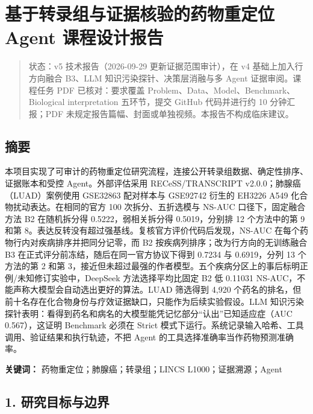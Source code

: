 \documentclass[
  10pt,
]{ctexart}
\author{}
\date{}
\begin{document}
\section{基于转录组与证据核验的药物重定位 Agent
课程设计报告}\label{ux57faux4e8eux8f6cux5f55ux7ec4ux4e0eux8bc1ux636eux6838ux9a8cux7684ux836fux7269ux91cdux5b9aux4f4d-agent-ux8bfeux7a0bux8bbeux8ba1ux62a5ux544a}

\begin{quote}
状态：v5 技术报告（2026-09-29 更新证据范围审计），在 v4
基础上加入行方向融合 B3、LLM 知识污染探针、决策层消融与多 Agent
证据审阅。课程任务 PDF 已核对：要求覆盖
Problem、Data、Model、Benchmark、Biological interpretation 五环节，提交
GitHub 代码并进行约 10 分钟汇报；PDF
未规定报告篇幅、封面或单独视频。本报告不构成临床建议。
\end{quote}

\subsection{摘要}\label{ux6458ux8981}

本项目实现了可审计的药物重定位研究流程，连接公开转录组数据、确定性排序、证据账本和受控
Agent。外部评估采用 RECeSS/TRANSCRIPT v2.0.0；肺腺癌（LUAD）案例使用
GSE32863 配对样本与 GSE92742 衍生的 EH3226 A549
化合物扰动表达。在相同的官方 100 次拆分、五折选模与 NS-AUC
口径下，固定融合方法 B2 在随机拆分得 0.5222，弱相关拆分得 0.5019，分别排
12 个方法中的第 9 和第
8。表达反转没有超过强基线。复核官方评价代码后发现，NS-AUC
在每个药物行内对疾病排序并把同分记零，而 B2
按疾病列排序；改为行方向的无训练融合 B3
在正式评分前冻结，随后在同一官方协议下得到 0.7234 与 0.6919，分列 13
个方法的第 2 和第
3，接近但未超过最强的作者模型。五个疾病分区上的事后标明正例/未知修订实验中，DeepSeek
方法选择平均比固定 B2 低 0.11031
NS-AUC，不能声称大模型会自动选出更好的算法。LUAD 筛选得到 4,920
个药名的排名，但前十名存在化合物身份与疗效证据缺口，只能作为后续实验假设。LLM
知识污染探针表明：看得到药名和病名的大模型能凭记忆部分``认出''已知适应症（AUC
0.567），这证明 Benchmark 必须在 Strict
模式下运行。系统记录输入哈希、工具调用、验证结果和执行轨迹，不把 Agent
的工具选择准确率当作药物预测准确率。

\textbf{关键词：} 药物重定位；肺腺癌；转录组；LINCS
L1000；证据溯源；Agent

\subsection{1.
研究目标与边界}\label{1-ux7814ux7a76ux76eeux6807ux4e0eux8fb9ux754c}
\end{document}
